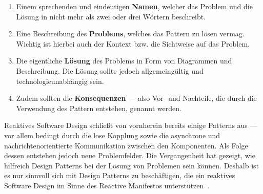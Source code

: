 \begin{enumerate}
\item Einem sprechenden und eindeutigen \textbf{Namen}, welcher das Problem und die Lösung in nicht mehr als zwei oder drei Wörtern beschreibt.
\item Eine Beschreibung des \textbf{Problems}, welches das Pattern zu lösen vermag. Wichtig ist hierbei auch der Kontext bzw. die Sichtweise auf das Problem.
\item Die eigentliche \textbf{Lösung} des Problems in Form von Diagrammen und Beschreibung. Die Lösung sollte jedoch allgemeingültig und technologieunabhängig sein.
\item Zudem sollten die \textbf{Konsequenzen} --- also Vor- und Nachteile, die durch die Verwendung des Pattern entstehen, genannt werden.
\end{enumerate}

Reaktives Software Design schließt von vornherein bereits einige Patterns aus --- vor allem bedingt durch die lose Kopplung sowie die asynchrone und nachrichtenorientierte Kommunikation zwischen den Komponenten. Als Folge dessen entstehen jedoch neue Problemfelder. Die Vergangenheit hat gezeigt, wie hilfreich Design Patterns bei der Lösung von Problemen sein können. Deshalb ist es nur sinnvoll sich mit Design Patterns zu beschäftigen, die ein reaktives Software Design im Sinne des Reactive Manifestos unterstützen~\cite[S.~54]{kuhn_reactive_2015}.
